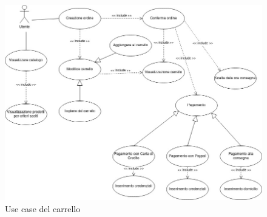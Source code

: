 \documentclass{article}
\begin{document}
\begin{figure}[h!]
	\centering
	\includegraphics[width=\textwidth]{UseCaseUtenteGestioneCarrello.jpg}
	\caption{Use case del carrello}
	\label{fig:UseCaseUtenteGestioneCarrello}
\end{figure}
\end{document}
